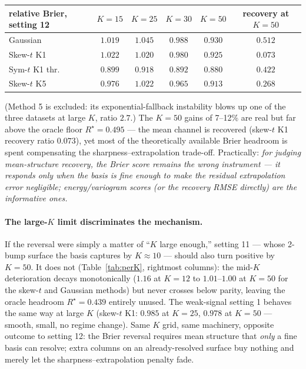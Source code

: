 \documentclass[11pt]{article}
\begin{document}
\begin{center}\small
\begin{tabular}{lcccc|c}
\toprule
relative Brier, setting 12 & $K{=}15$ & $K{=}25$ & $K{=}30$ & $K{=}50$ &
recovery at $K{=}50$ \\
\midrule
Gaussian        & $1.019$ & $1.045$ & $0.988$ & $\mathbf{0.930}$ & $0.512$ \\
Skew-$t$ K1     & $1.022$ & $1.020$ & $0.980$ & $\mathbf{0.925}$ & $0.073$ \\
Sym-$t$ K1 thr. & $0.899$ & $0.918$ & $0.892$ & $\mathbf{0.880}$ & $0.422$ \\
Skew-$t$ K5     & $0.976$ & $1.022$ & $0.965$ & $\mathbf{0.913}$ & $0.268$ \\
\bottomrule
\end{tabular}
\end{center}

(Method 5 is excluded: its exponential-fallback instability blows up one of the
three datasets at large $K$, ratio $2.7$.) The $K{=}50$ gains of 7--12\% are
real but far above the oracle floor $R^\star = 0.495$ --- the mean channel is
recovered (skew-$t$ K1 recovery ratio $0.073$), yet most of the theoretically
available Brier headroom is spent compensating the sharpness--extrapolation
trade-off. Practically: \emph{for judging mean-structure recovery, the Brier
score remains the wrong instrument --- it responds only when the basis is fine
enough to make the residual extrapolation error negligible; energy/variogram
scores (or the recovery RMSE directly) are the informative ones.}

\paragraph{The large-$K$ limit discriminates the mechanism.}
If the reversal were simply a matter of ``$K$ large enough,'' setting 11 ---
whose 2-bump surface the basis captures by $K \approx 10$ --- should also turn
positive by $K = 50$. It does not (Table~\ref{tab:perK}, rightmost columns):
the mid-$K$ deterioration decays monotonically ($1.16$ at $K{=}12$ to
$1.01$--$1.00$ at $K{=}50$ for the skew-$t$ and Gaussian methods) but never
crosses below parity, leaving the oracle headroom $R^\star = 0.439$ entirely
unused. The weak-signal setting 1 behaves the same way at large $K$ (skew-$t$
K1: $0.985$ at $K{=}25$, $0.978$ at $K{=}50$ --- smooth, small, no regime
change). Same $K$ grid, same machinery, opposite outcome to setting 12: the
Brier reversal requires mean structure that \emph{only} a fine basis can
resolve; extra columns on an already-resolved surface buy nothing and merely
let the sharpness--extrapolation penalty fade.
\end{document}
